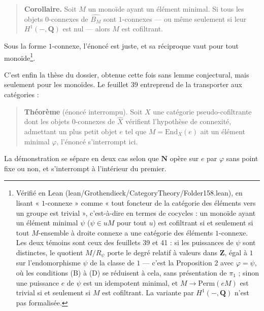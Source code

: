 \documentclass[11pt,a4paper]{article}
\begin{document}
\begin{quote}
\textbf{Corollaire.} Soit $M$ un monoïde ayant un élément minimal. Si tous les
objets $0$-connexes de $\widehat{B_{M}}$ sont $1$-connexes — ou même seulement
si leur $H^{1}(-,\mathbf{Q})$ est nul — alors $M$ est cofiltrant.
\end{quote}

Sous la forme $1$-connexe, l'énoncé est juste, et sa réciproque vaut pour tout
monoïde\footnote{Vérifié en Lean (lean/Grothendieck/CategoryTheory/Folder158.lean), en lisant
« $1$-connexe » comme « tout foncteur de la catégorie des éléments vers un
groupe est trivial », c'est-à-dire en termes de cocycles : un monoïde ayant un
élément minimal $\psi$ ($\psi \in uM$ pour tout $u$) est cofiltrant si et
seulement si tout $M$-ensemble à droite connexe a une catégorie des éléments
$1$-connexe. Les deux témoins sont ceux des feuillets 39 et 41 : si les
puissances de $\psi$ sont distinctes, le quotient $M/R_{\psi}$ porte le degré
relatif à valeurs dans $\mathbf{Z}$, égal à $1$ sur l'endomorphisme $\psi$ de
la classe de $1$ — c'est la Proposition 2 avec $\varphi = \psi$, où les
conditions (B) à (D) se réduisent à cela, sans présentation de $\pi_1$ ;
sinon une puissance $e$ de $\psi$ est un idempotent minimal, et
$M \to \mathrm{Perm}(eM)$ est trivial si et seulement si $M$ est cofiltrant.
La variante par $H^{1}(-, \mathbf{Q})$ n'est pas formalisée.}.

C'est enfin la thèse du dossier, obtenue cette fois sans lemme conjectural,
mais seulement pour les monoïdes. Le feuillet 39 entreprend de la transporter
aux catégories :

\begin{quote}
\textbf{Théorème} (énoncé interrompu). Soit $X$ une catégorie
pseudo-cofiltrante dont les objets $0$-connexes de $\widehat{X}$ vérifient
l'hypothèse de connexité, admettant un plus petit objet $e$ tel que
$M = \mathrm{End}_{X}(e)$ ait un élément minimal $\varphi$, l'énoncé s'interrompt ici.
\end{quote}

La démonstration se sépare en deux cas selon que $\mathbf{N}$ opère sur $e$
par $\varphi$ sans point fixe ou non, et s'interrompt à l'intérieur du premier.
\end{document}
